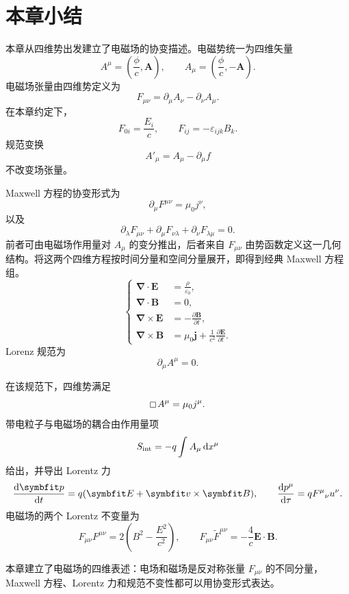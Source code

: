 \section{本章小结}

本章从四维势出发建立了电磁场的协变描述。电磁势统一为四维矢量
\[
A^{\mu}
=
\left(
\frac{\phi}{c},
\bm{A}
\right),
\qquad
A_{\mu}
=
\left(
\frac{\phi}{c},
-\bm{A}
\right).
\]
电磁场张量由四维势定义为
\[
F_{\mu\nu}
=
\partial_{\mu}A_{\nu}-\partial_{\nu}A_{\mu}.
\]
在本章约定下，
\[
F_{0i}=\frac{E_{i}}{c},
\qquad
F_{ij}=-\varepsilon_{ijk}B_{k}.
\]
规范变换
\[
A'_{\mu}=A_{\mu}-\partial_{\mu}f
\]
不改变场张量。

Maxwell 方程的协变形式为
\[
\partial_{\mu}F^{\mu\nu}=\mu_{0}j^{\nu},
\]
以及
\[
\partial_{\lambda}F_{\mu\nu}
+
\partial_{\mu}F_{\nu\lambda}
+
\partial_{\nu}F_{\lambda\mu}=0.
\]
前者可由电磁场作用量对 $A_{\mu}$ 的变分推出，后者来自
$F_{\mu\nu}$ 由势函数定义这一几何结构。将这两个四维方程按时间分量和空间分量展开，即得到经典 Maxwell 方程组。
\[
	\left\{
	\begin{aligned}
		\bm{\nabla}\cdot\bm{E}
		&=
		\frac{\rho}{\varepsilon_{0}}, \\[6pt]
		\bm{\nabla}\cdot\bm{B}
		&=
		0, \\[6pt]
		\bm{\nabla}\times\bm{E}
		&=
		-\frac{\partial\bm{B}}{\partial t}, \\[6pt]
		\bm{\nabla}\times\bm{B}
		&=
		\mu_{0}\bm{j}
		+
		\frac{1}{c^{2}}\frac{\partial\bm{E}}{\partial t}.
	\end{aligned}
	\right.
\]
Lorenz 规范为
\[
\partial_{\mu}A^{\mu}=0.
\]

在该规范下，四维势满足
\[
\dalembert A^{\mu}=\mu_{0}j^{\mu}.
\]
带电粒子与电磁场的耦合由作用量项
\[
S_{\mathrm{int}}=-q\int A_{\mu}\mathop{}\!\mathrm{d} x^{\mu}
\]
给出，并导出 Lorentz 力
\[
\frac{\dif\bm{p}}{\dif t}
=
q(\bm{E}+\bm{v}\times\bm{B}),
\qquad
\frac{\dif p^{\mu}}{\dif\tau}=qF^{\mu}{}_{\nu}u^{\nu}.
\]
电磁场的两个 Lorentz 不变量为
\[
F_{\mu\nu}F^{\mu\nu}
=
2\left(B^{2}-\frac{E^{2}}{c^{2}}\right),
\qquad
F_{\mu\nu}\widetilde{F}^{\mu\nu}
=
-\frac{4}{c}\bm{E}\cdot\bm{B}.
\]

本章建立了电磁场的四维表述：电场和磁场是反对称张量 $F_{\mu\nu}$ 的不同分量，Maxwell 方程、Lorentz 力和规范不变性都可以用协变形式表达。
